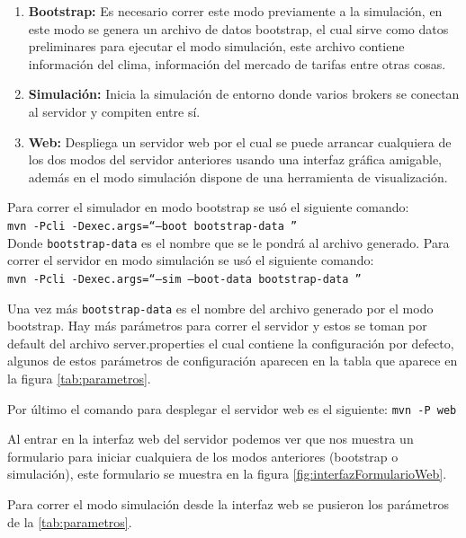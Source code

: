 \begin{enumerate}
	\item \textbf{Bootstrap:} Es necesario correr este modo previamente a la simulación, en este modo se genera un archivo de datos bootstrap, el cual sirve como datos preliminares para ejecutar el modo simulación, este archivo contiene información del clima, información del mercado de tarifas entre otras cosas.

	\item \textbf{Simulación:} Inicia la simulación de entorno donde varios brokers se conectan al servidor y compiten entre sí.
	\item \textbf{Web: } Despliega un servidor web por el cual se puede arrancar cualquiera de los dos modos del servidor anteriores usando una interfaz gráfica amigable, además en el modo simulación dispone de una herramienta de visualización.
\end{enumerate}

Para correr el simulador en modo bootstrap se usó el siguiente comando:\\
\texttt{mvn -Pcli -Dexec.args=``--boot bootstrap-data ''}\\
Donde \texttt{bootstrap-data} es el nombre que se le pondrá al archivo generado.
Para correr el servidor en modo simulación se usó el siguiente comando:\\
\texttt{mvn -Pcli -Dexec.args=``--sim --boot-data bootstrap-data ''}

Una vez más \texttt{bootstrap-data} es el nombre del archivo generado por el modo bootstrap. Hay más parámetros para correr el servidor y estos se toman por default del archivo server.properties el cual contiene la configuración por defecto, algunos de estos parámetros de configuración aparecen en la tabla que aparece en la figura \ref{tab:parametros}.

Por último el comando para desplegar el servidor web es el siguiente:
\texttt{mvn -P web}

Al entrar en la interfaz web del servidor podemos ver que nos muestra un formulario para iniciar cualquiera de los modos anteriores (bootstrap o simulación), este formulario se muestra en la figura \ref{fig:interfazFormularioWeb}.

Para correr el modo simulación desde la interfaz web se pusieron los parámetros de la \ref{tab:parametros}.

